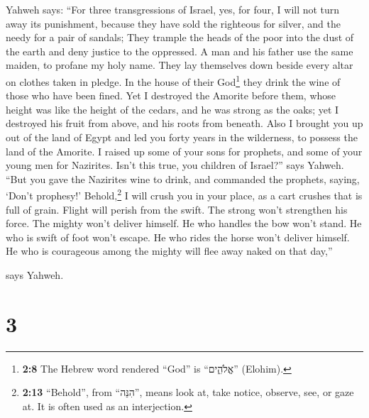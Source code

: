  Yahweh says: ``For three transgressions of Israel, yes,
for four, I will not turn away its punishment, because they have sold
the righteous for silver, and the needy for a pair of sandals;
 They trample the heads of the poor into the dust of the
earth and deny justice to the oppressed. A man and his father use the
same maiden, to profane my holy name.  They lay themselves
down beside every altar on clothes taken in pledge. In the house of
their God\footnote{\textbf{2:8} The Hebrew word rendered ``God'' is
  ``אֱלֹהִ֑ים'' (Elohim).} they drink the wine of those who have been
fined.  Yet I destroyed the Amorite before them, whose
height was like the height of the cedars, and he was strong as the oaks;
yet I destroyed his fruit from above, and his roots from beneath.
 Also I brought you up out of the land of Egypt and led
you forty years in the wilderness, to possess the land of the Amorite.
 I raised up some of your sons for prophets, and some of
your young men for Nazirites. Isn't this true, you children of Israel?''
says Yahweh.  ``But you gave the Nazirites wine to drink,
and commanded the prophets, saying, `Don't prophesy!' 
Behold,\footnote{\textbf{2:13} ``Behold'', from ``הִנֵּה'', means look
  at, take notice, observe, see, or gaze at. It is often used as an
  interjection.} I will crush you in your place, as a cart crushes that
is full of grain.  Flight will perish from the swift. The
strong won't strengthen his force. The mighty won't deliver himself.
 He who handles the bow won't stand. He who is swift of
foot won't escape. He who rides the horse won't deliver himself.
 He who is courageous among the mighty will flee away
naked on that day,''

says Yahweh.

\hypertarget{section-2}{%
\section{3}\label{section-2}}

